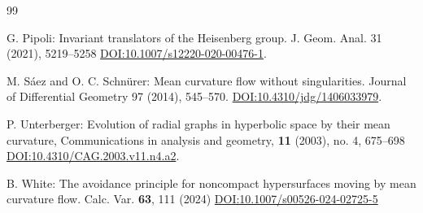 \documentclass{amsart}[12pt]
\newcommand{\DOI}[1]{\href{https://doi.org/#1}{DOI:#1}}
\theoremstyle{definition}
\theoremstyle{plain}
\newcommand{\vt}{\vspace{.1cm}}
\begin{document}
\begin{thebibliography}{99}
\vt

 G. Pipoli: Invariant translators of the Heisenberg group. J. Geom. Anal. 31 (2021), 5219--5258
\DOI{10.1007/s12220-020-00476-1}.

\vt

 M. Sáez and O. C. Schnürer: Mean curvature flow without singularities.
Journal of Differential Geometry 97 (2014), 545--570. 
\DOI{10.4310/jdg/1406033979}. 

\vt

 P. Unterberger: Evolution of radial graphs in hyperbolic space by their mean curvature,
Communications in analysis and geometry, {\bf 11} (2003), no. 4, 675--698
\DOI{10.4310/CAG.2003.v11.n4.a2}.
\vt

 B. White: The avoidance principle for noncompact hypersurfaces
moving by mean curvature flow. Calc. Var. {\bf 63}, 111 (2024)
\DOI{10.1007/s00526-024-02725-5}

\end{thebibliography}
\end{document}

